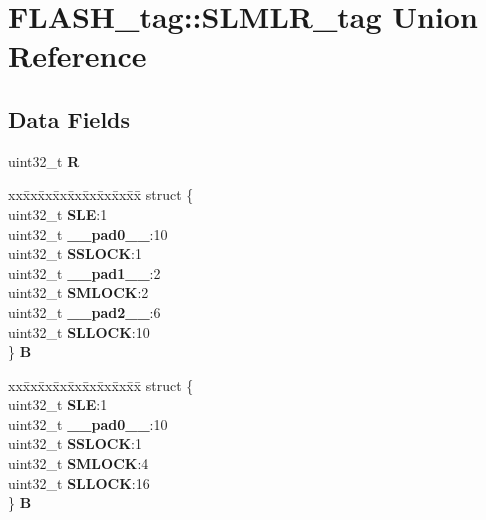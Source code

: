 \hypertarget{unionFLASH__tag_1_1SLMLR__tag}{}\section{F\+L\+A\+S\+H\+\_\+tag\+::S\+L\+M\+L\+R\+\_\+tag Union Reference}
\label{unionFLASH__tag_1_1SLMLR__tag}
\subsection*{Data Fields}
\begin{DoxyCompactItemize}
\item 
\mbox{\label{unionFLASH__tag_1_1SLMLR__tag_a69f01e6045353ad27d0b8352fa19a0a9}} 
uint32\+\_\+t {\bfseries R}
\item 
\mbox{\label{unionFLASH__tag_1_1SLMLR__tag_a5f173306576e6b343fcadb26cf5b6a0e}} 
\begin{tabbing}
xx\=xx\=xx\=xx\=xx\=xx\=xx\=xx\=xx\=\kill
struct \{\\
\>uint32\_t {\bfseries SLE}:1\\
\>uint32\_t {\bfseries \_\_pad0\_\_}:10\\
\>uint32\_t {\bfseries SSLOCK}:1\\
\>uint32\_t {\bfseries \_\_pad1\_\_}:2\\
\>uint32\_t {\bfseries SMLOCK}:2\\
\>uint32\_t {\bfseries \_\_pad2\_\_}:6\\
\>uint32\_t {\bfseries SLLOCK}:10\\
\} {\bfseries B}\\

\end{tabbing}\item 
\mbox{\label{unionFLASH__tag_1_1SLMLR__tag_a5cac9ae16724327c32cac33d549dd8ce}} 
\begin{tabbing}
xx\=xx\=xx\=xx\=xx\=xx\=xx\=xx\=xx\=\kill
struct \{\\
\>uint32\_t {\bfseries SLE}:1\\
\>uint32\_t {\bfseries \_\_pad0\_\_}:10\\
\>uint32\_t {\bfseries SSLOCK}:1\\
\>uint32\_t {\bfseries SMLOCK}:4\\
\>uint32\_t {\bfseries SLLOCK}:16\\
\} {\bfseries B}\\


\end{tabbing}
\end{DoxyCompactItemize}
